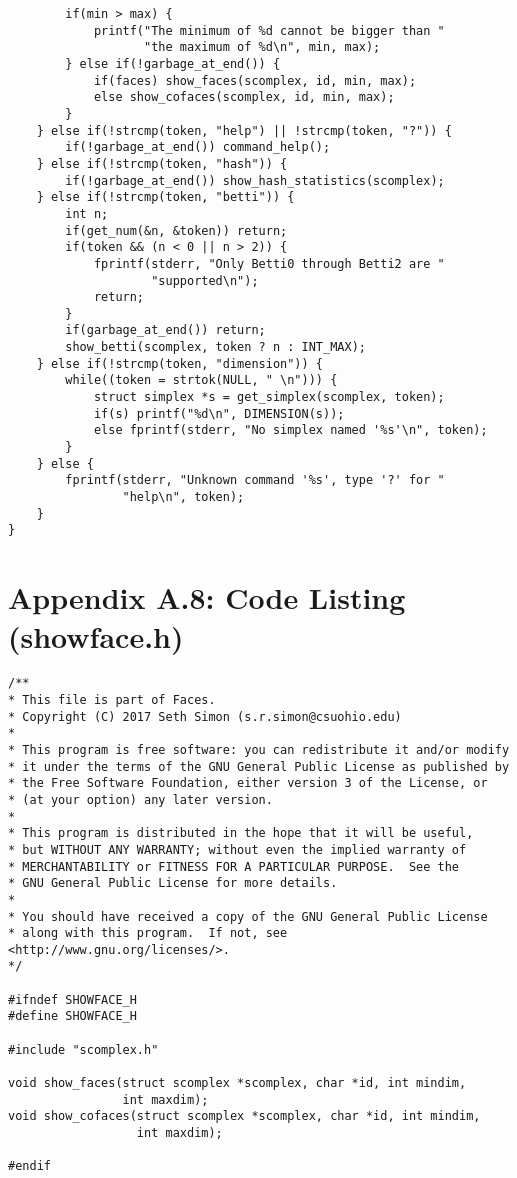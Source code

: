 \documentclass{article}
\begin{document}
\begin{verbatim}
        if(min > max) {
            printf("The minimum of %d cannot be bigger than "
                   "the maximum of %d\n", min, max);
        } else if(!garbage_at_end()) {
            if(faces) show_faces(scomplex, id, min, max);
            else show_cofaces(scomplex, id, min, max);
        }
    } else if(!strcmp(token, "help") || !strcmp(token, "?")) {
        if(!garbage_at_end()) command_help();
    } else if(!strcmp(token, "hash")) {
        if(!garbage_at_end()) show_hash_statistics(scomplex);
    } else if(!strcmp(token, "betti")) {
        int n;
        if(get_num(&n, &token)) return;
        if(token && (n < 0 || n > 2)) {
            fprintf(stderr, "Only Betti0 through Betti2 are "
                    "supported\n");
            return;
        }
        if(garbage_at_end()) return;
        show_betti(scomplex, token ? n : INT_MAX);
    } else if(!strcmp(token, "dimension")) {
        while((token = strtok(NULL, " \n"))) {
            struct simplex *s = get_simplex(scomplex, token);
            if(s) printf("%d\n", DIMENSION(s));
            else fprintf(stderr, "No simplex named '%s'\n", token);
        }
    } else {
        fprintf(stderr, "Unknown command '%s', type '?' for "
                "help\n", token);
    }
}
\end{verbatim}
\normalsize

\section{Appendix A.8: Code Listing (showface.h)}
\small
\begin{verbatim}
/**
* This file is part of Faces.
* Copyright (C) 2017 Seth Simon (s.r.simon@csuohio.edu)
* 
* This program is free software: you can redistribute it and/or modify
* it under the terms of the GNU General Public License as published by
* the Free Software Foundation, either version 3 of the License, or
* (at your option) any later version.
* 
* This program is distributed in the hope that it will be useful,
* but WITHOUT ANY WARRANTY; without even the implied warranty of
* MERCHANTABILITY or FITNESS FOR A PARTICULAR PURPOSE.  See the
* GNU General Public License for more details.
* 
* You should have received a copy of the GNU General Public License
* along with this program.  If not, see <http://www.gnu.org/licenses/>.
*/

#ifndef SHOWFACE_H
#define SHOWFACE_H

#include "scomplex.h"

void show_faces(struct scomplex *scomplex, char *id, int mindim,
                int maxdim);
void show_cofaces(struct scomplex *scomplex, char *id, int mindim,
                  int maxdim);

#endif
\end{verbatim}
\normalsize
\end{document}
